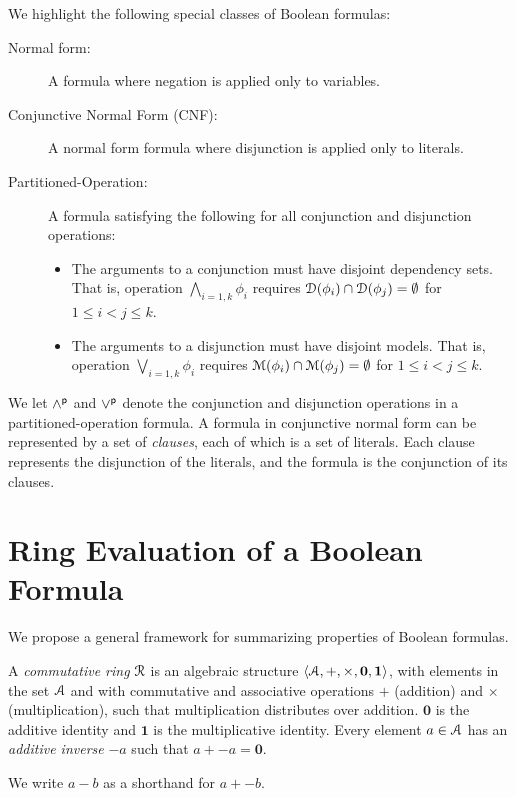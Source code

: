 \documentclass[letterpaper,USenglish,cleveref, autoref, thm-restate]{lipics-v2021}
\newcommand{\pand}{\mathbin{\land^{\sf p}}}
\newcommand{\por}{\mathbin{\lor^{\sf p}}}
\newcommand{\dependencyset}{{\cal D}}
\newcommand{\ring}{{\cal R}}
\newcommand{\dset}{{\cal A}}
\newcommand{\radd}{+}
\newcommand{\rmul}{\times}
\newcommand{\addident}{\textbf{0}}
\newcommand{\mulident}{\textbf{1}}
\newcommand{\modelset}{{\cal M}}
\begin{document}
  We highlight the following special classes of Boolean formulas:
  \begin{description}
    \item[Normal form:] A formula where negation is applied only to variables.
    \item[Conjunctive Normal Form (CNF):] A normal form formula where  disjunction is applied only to literals.
    \item[Partitioned-Operation:] A formula satisfying the following for all conjunction and disjunction operations: 
      \begin{itemize}
      \item The arguments to a conjunction must have disjoint dependency sets.  That is, operation
        $\bigwedge_{i=1,k} \phi_i$ requires $\dependencyset(\phi_i) \cap \dependencyset(\phi_j) = \emptyset$ for $1 \leq i < j \leq k$.
      \item The arguments to a disjunction must have disjoint models.  That is, operation
        $\bigvee_{i=1,k} \phi_i$ requires $\modelset(\phi_i) \cap \modelset(\phi_j) = \emptyset$ for $1 \leq i < j \leq k$.
      \end{itemize}
  \end{description}
     We let $\pand$ and $\por$ denote the conjunction and disjunction operations in a partitioned-operation formula.
     A formula in conjunctive normal form can be represented by a set
     of {\em clauses}, each of which is a set of literals.  Each
     clause represents the disjunction of the literals, and the formula is the conjunction of its clauses.
  
  \section{Ring Evaluation of a Boolean Formula}

We propose a general framework for 
summarizing properties of Boolean formulas.

\begin{definition}
  A {\em commutative ring} $\ring$ is an algebraic structure
  $\langle \dset, \radd, \rmul, \addident, \mulident \rangle$, 
  with elements in the set $\dset$ and with commutative and
  associative operations $\radd$ (addition) and $\rmul$ (multiplication),
  such that multiplication distributes
  over addition.  $\addident$ is the additive identity and $\mulident$ is
  the multiplicative identity.  Every element $a \in \dset$ has an
  {\em additive inverse} $-a$ such that $a + -a = \addident$.
\label{def:ring}
\end{definition}
We write $a - b$ as a shorthand for $a + -b$.
\end{document}

